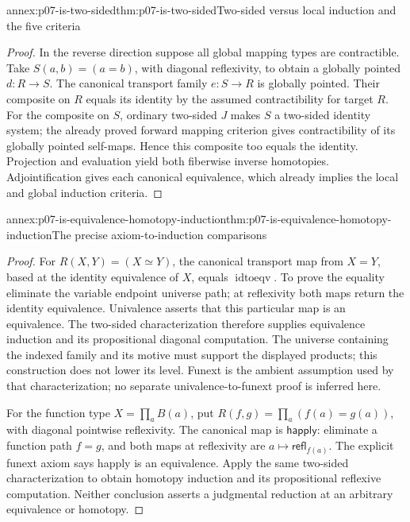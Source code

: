 \begin{annexitem}{annex:p07-is-two-sided}{thm:p07-is-two-sided}{Two-sided versus local induction and the five criteria}
\begin{proof}
In the reverse direction suppose all global mapping types are
contractible. Take \(S(a,b)=(a=b)\), with diagonal reflexivity, to
obtain a globally pointed \(d:R\to S\).
The canonical transport family \(e:S\to R\) is globally pointed.
Their composite on \(R\) equals its identity by the assumed
contractibility for target \(R\).
For the composite on \(S\), ordinary two-sided \(J\) makes \(S\)
a two-sided identity system; the already proved forward mapping
criterion gives contractibility of its globally pointed self-maps.
Hence this composite too equals the identity. Projection and
evaluation yield both fiberwise inverse homotopies.
Adjointification gives each canonical equivalence, which already
implies the local and global induction criteria.
\end{proof}
\end{annexitem}

\begin{annexitem}{annex:p07-is-equivalence-homotopy-induction}{thm:p07-is-equivalence-homotopy-induction}{The precise axiom-to-induction comparisons}
\begin{proof}
For \(R(X,Y)=(X\simeq Y)\), the canonical transport map from
\(X=Y\), based at the identity equivalence of \(X\), equals
\(\operatorname{idtoeqv}\). To prove the equality eliminate the
variable endpoint universe path; at reflexivity both maps return the
identity equivalence. Univalence asserts that this particular map
is an equivalence. The two-sided characterization therefore supplies
equivalence induction and its propositional diagonal computation.
The universe containing the indexed family and its motive must support
the displayed products; this construction does not lower its level.
Funext is the ambient assumption used by that characterization;
no separate univalence-to-funext proof is inferred here.

For the function type \(X=\prod_aB(a)\), put
\(R(f,g)=\prod_a(f(a)=g(a))\), with diagonal pointwise reflexivity.
The canonical map is \(\mathsf{happly}\): eliminate a function path
\(f=g\), and both maps at reflexivity are
\(a\mapsto\mathsf{refl}_{f(a)}\).
The explicit funext axiom says happly is an equivalence.
Apply the same two-sided characterization to obtain homotopy induction
and its propositional reflexive computation.
Neither conclusion asserts a judgmental reduction at an arbitrary
equivalence or homotopy.
\end{proof}
\end{annexitem}

